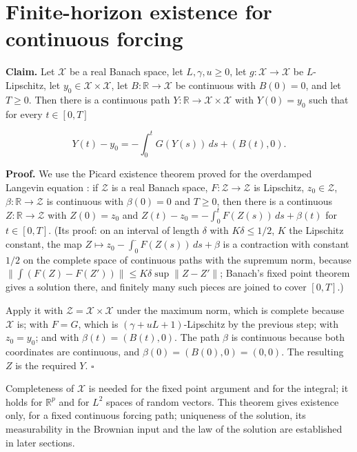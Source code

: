 \documentclass[11pt,a4paper]{article}
\begin{document}
\section{\texorpdfstring{Finite-horizon existence for continuous forcing}{Finite-horizon existence for continuous forcing}}


\textbf{Claim.} Let \(\mathcal X\) be a real Banach space, let \(L,\gamma,u\ge0\), let \(g:\mathcal X\to\mathcal X\) be \(L\)-Lipschitz, let \(y_0\in\mathcal X\times\mathcal X\), let \(B:\mathbb R\to\mathcal X\) be continuous with \(B(0)=0\), and let \(T\ge0\). Then there is a continuous path \(Y:\mathbb R\to\mathcal X\times\mathcal X\) with \(Y(0)=y_0\) such that for every \(t\in[0,T]\)


\[Y(t)-y_0=-\int_0^tG(Y(s))\,ds+(B(t),0).\]


\textbf{Proof.} We use the Picard existence theorem proved for the overdamped Langevin equation \cite[Section~3.14.3]{LangevinLean2026ULASC}: if \(\mathcal Z\) is a real Banach space, \(F:\mathcal Z\to\mathcal Z\) is Lipschitz, \(z_0\in\mathcal Z\), \(\beta:\mathbb R\to\mathcal Z\) is continuous with \(\beta(0)=0\) and \(T\ge0\), then there is a continuous \(Z:\mathbb R\to\mathcal Z\) with \(Z(0)=z_0\) and \(Z(t)-z_0=-\int_0^tF(Z(s))\,ds+\beta(t)\) for \(t\in[0,T]\). (Its proof: on an interval of length \(\delta\) with \(K\delta\le1/2\), \(K\) the Lipschitz constant, the map \(Z\mapsto z_0-\int_0^{\cdot}F(Z(s))\,ds+\beta\) is a contraction with constant \(1/2\) on the complete space of continuous paths with the supremum norm, because \(\|\int(F(Z)-F(Z'))\|\le K\delta\sup\|Z-Z'\|\); Banach's fixed point theorem gives a solution there, and finitely many such pieces are joined to cover \([0,T]\).)




Apply it with \(\mathcal Z=\mathcal X\times\mathcal X\) under the maximum norm, which is complete because \(\mathcal X\) is; with \(F=G\), which is \((\gamma+uL+1)\)-Lipschitz by the previous step; with \(z_0=y_0\); and with \(\beta(t)=(B(t),0)\). The path \(\beta\) is continuous because both coordinates are continuous, and \(\beta(0)=(B(0),0)=(0,0)\). The resulting \(Z\) is the required \(Y\). \(\square\)




Completeness of \(\mathcal X\) is needed for the fixed point argument and for the integral; it holds for \(\mathbb R^p\) and for \(L^2\) spaces of random vectors. This theorem gives existence only, for a fixed continuous forcing path; uniqueness of the solution, its measurability in the Brownian input and the law of the solution are established in later sections.
\end{document}
